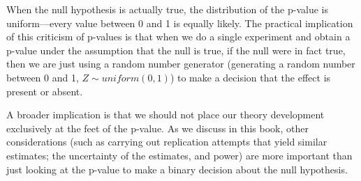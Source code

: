 \documentclass[
  12pt,
]{krantz}
\theoremstyle{definition}
\theoremstyle{definition}
\theoremstyle{definition}
\theoremstyle{definition}
\theoremstyle{remark}
\begin{document}
When the null hypothesis is actually true, the distribution of the p-value is uniform---every value between 0 and 1 is equally likely. The practical implication of this criticism of p-values is that when we do a single experiment and obtain a p-value under the assumption that the null is true, if the null were in fact true, then we are just using a random number generator (generating a random number between 0 and 1, \(Z\sim uniform(0,1)\)) to make a decision that the effect is present or absent.

A broader implication is that we should not place our theory development exclusively at the feet of the p-value. As we discuss in this book, other considerations (such as carrying out replication attempts that yield similar estimates; the uncertainty of the estimates, and power) are more important than just looking at the p-value to make a binary decision about the null hypothesis.
\end{document}

